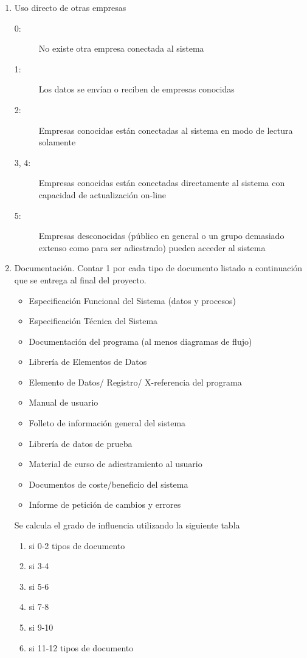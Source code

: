\begin{enumerate}
            \item Uso directo de otras empresas
                \begin{description}
                   \item[0:]No existe otra empresa conectada al sistema
                   \item[1:]Los datos se envían o reciben de empresas conocidas
                   \item[2:]Empresas conocidas están conectadas al sistema en modo de lectura solamente
                   \item[3, 4:]Empresas conocidas están conectadas directamente al sistema con capacidad de actualización on-line
                   \item[5:]Empresas desconocidas (público en general o un grupo demasiado extenso como para ser adiestrado) pueden acceder al sistema
                \end{description}
            \item Documentación. Contar 1 por cada tipo de documento listado a continuación que se entrega al final del proyecto.
                \begin{itemize}
                    \item Especificación Funcional del Sistema (datos y procesos)
                    \item Especificación Técnica del Sistema
                    \item Documentación del programa (al menos diagramas de flujo)
                    \item Librería de Elementos de Datos
                    \item Elemento de Datos/ Registro/ X-referencia del programa
                    \item Manual de usuario
                    \item Folleto de información general del sistema
                    \item Librería de datos de prueba
                    \item Material de curso de adiestramiento al usuario
                    \item Documentos de coste/beneficio del sistema
                    \item Informe de petición de cambios y errores
                \end{itemize}
                Se calcula el grado de influencia utilizando la siguiente tabla
                \begin{enumerate}
                   \item si 0-2 tipos de documento
                   \item si 3-4
                   \item si 5-6
                   \item si 7-8
                   \item si 9-10
                   \item si 11-12 tipos de documento
                \end{enumerate}
        \end{enumerate}
    
    
